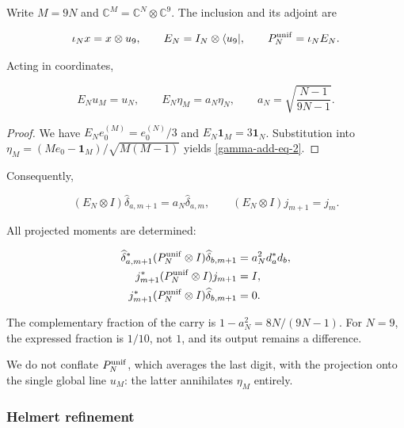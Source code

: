 Write \(M=9N\) and \(\mathbb C^M=\mathbb C^N\otimes\mathbb C^9\). The inclusion and its adjoint are

\begin{equation}
\iota_Nx=x\otimes u_9,\qquad
E_N=I_N\otimes\langle u_9|,\qquad P_N^{\rm unif}=\iota_NE_N.
\label{gamma-add-display-8}
\end{equation}

Acting in coordinates,

\begin{equation}
E_Nu_M=u_N,\qquad
E_N\eta_M=a_N\eta_N,\qquad
a_N=\sqrt{\frac{N-1}{9N-1}}.
\label{gamma-add-eq-2}
\end{equation}

\begin{proof}
We have \(E_Ne_0^{(M)}=e_0^{(N)}/3\) and \(E_N\mathbf1_M=3\mathbf1_N\).
Substitution into \(\eta_M=(Me_0-\mathbf1_M)/\sqrt{M(M-1)}\)
yields \eqref{gamma-add-eq-2}.
\end{proof}

Consequently,

\begin{equation}
(E_N\otimes I)\widehat\delta_{a,m+1}=a_N\widehat\delta_{a,m},
\qquad
(E_N\otimes I)j_{m+1}=j_m.
\label{gamma-add-eq-3}
\end{equation}

All projected moments are determined:

\begin{equation}
\begin{aligned}
\widehat\delta_{a,m+1}^*(P_N^{\rm unif}\otimes I)\widehat\delta_{b,m+1}
 &=a_N^2d_a^*d_b,\\
j_{m+1}^*(P_N^{\rm unif}\otimes I)j_{m+1}&=I,\\
j_{m+1}^*(P_N^{\rm unif}\otimes I)\widehat\delta_{b,m+1}&=0.
\end{aligned}
\label{gamma-add-eq-4}
\end{equation}

The complementary fraction of the carry is \(1-a_N^2=8N/(9N-1)\). For \(N=9\), the expressed fraction is \(1/10\), not \(1\), and its output remains a difference.

We do not conflate \(P_N^{\rm unif}\), which averages the last digit, with the projection onto the single global line \(u_M\): the latter annihilates \(\eta_M\) entirely.

\subsubsection{Helmert refinement}
\label{gamma-add-sub-156}

